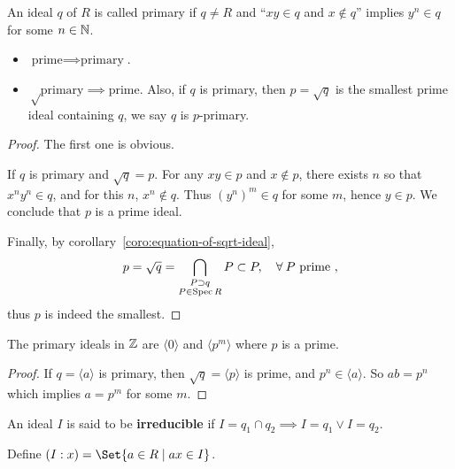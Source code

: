 \begin{definition}
  An ideal $q$ of $R$ is called primary if $q \neq R$ and ``$xy \in q$ and $x \notin q$''
  implies $y^n \in q$ for some $n \in \mathbb{N}$.
\end{definition}

\begin{prop} \hfill
  \begin{itemize}
    \item $\text{prime} \implies \text{primary}$.
    \item $\sqrt\text{primary} \implies \text{prime}$. Also, if $q$ is primary, then $p = \sqrt{q}$
      is the smallest prime ideal containing $q$, we say $q$ is $p$-primary.
  \end{itemize}

  \begin{proof}
    The first one is obvious.

    If $q$ is primary and $\sqrt{q} = p$. For any $xy \in p$ and $x \notin p$,
    there exists $n$ so that $x^n y^n \in q$, and for this $n$, $x^n \notin q$.
    Thus $(y^n)^m \in q$ for some $m$, hence $y \in p$. We conclude that $p$ is a prime ideal.

    Finally, by corollary~\ref{coro:equation-of-sqrt-ideal},
    \[ p = \sqrt{q} = \bigcap_{\substack{P \supset q \\ P \in \Spec R}} P \subset P,
    \quad \forall P \text{ prime }, \]
    thus $p$ is indeed the smallest.
  \end{proof}
\end{prop}

\begin{example}
  The primary ideals in $\mathbb{Z}$ are $\langle 0 \rangle$ and $\langle p^m \rangle$
  where $p$ is a prime.

  \begin{proof}
    If $q = \langle a \rangle$ is primary, then $\sqrt{q} = \langle p \rangle$ is
    prime, and $p^n \in \langle a \rangle$. So $ab = p^n$ which implies $a = p^m$
    for some $m$.
  \end{proof}
\end{example}

\begin{definition}
  An ideal $I$ is said to be {\bf irreducible} 
  if $I = q_1 \cap q_2 \implies I = q_1 \lor I = q_2$.
\end{definition}

\begin{definition}
  Define $(I: x) = \Set{ a \in R \mid ax \in I}$.
\end{definition}

